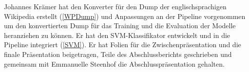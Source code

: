 Johannes Krämer hat den Konverter für den Dump der englischsprachigen Wikipedia erstellt (\ref{WPDump}) und Anpassungen an der Pipeline vorgenommen um den konvertierten Dump für das Training und die Evaluation der Modelle heranziehen zu können. Er hat den SVM-Klassifikator entwickelt und in die Pipeline integriert (\ref{SVM}). Er hat Folien für die Zwischenpräsentation und die finale Präsentation beigetragen, Teile des Abschlussberichts geschrieben und gemeinsam mit Emmanuelle Steenhof die Abschlusspräsentation gehalten.